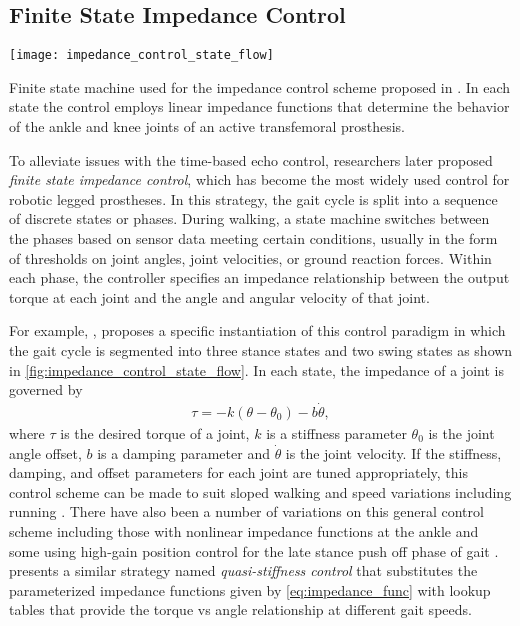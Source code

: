\subsection{Finite State Impedance Control}\label{sec:back_walk_fsm}
\begin{marginfigure}
    \centering
    \texttt{[image: impedance\_control\_state\_flow]}
    \caption[Example finite state machine for the impedance control].{Finite
    state machine used for the impedance control scheme proposed in
    \citet{sup2009preliminary}. In each state the control employs linear
    impedance functions that determine the behavior of the ankle and knee joints
    of an active transfemoral
    prosthesis.}\label{fig:impedance_control_state_flow}
\end{marginfigure}
To alleviate issues with the time-based echo control, researchers later proposed
\emph{finite state impedance control}, which has become the most widely used
control for robotic legged prostheses. In this strategy, the gait cycle is split
into a sequence of discrete states or phases. During walking, a state machine
switches between the phases based on sensor data meeting certain conditions,
usually in the form of thresholds on joint angles, joint velocities, or ground
reaction forces. Within each phase, the controller specifies an impedance
relationship between the output torque at each joint and the angle and angular
velocity of that joint.

For example, \citet{sup2009preliminary}, proposes a specific instantiation of
this control paradigm in which the gait cycle is segmented into three stance
states and two swing states as shown in \cref{fig:impedance_control_state_flow}.
In each state, the impedance of a joint is governed by
\begin{align}
    \tau = -k (\theta - \theta_{0}) - b \dot \theta,\label{eq:impedance_func}
\end{align}
where $\tau$ is the desired torque of a joint, $k$ is a stiffness parameter
$\theta_{0}$ is the joint angle offset, $b$ is a damping parameter and $\dot
\theta$ is the joint velocity. If the stiffness, damping, and offset parameters
for each joint are tuned appropriately, this control scheme can be made to suit
sloped walking \citep{sup2011upslope} and speed variations
\citep{shultz2016variable} including running \citep{shultz2015running}. There
have also been a number of variations on this general control scheme including
those with nonlinear impedance functions at the ankle
\citep{sup2007design,shultz2014walking} and some using high-gain position
control for the late stance push off phase of gait \citep{lawson2014robotic}.
\citet{lenzi2014speed} presents a similar strategy named \emph{quasi-stiffness
control} that substitutes the parameterized impedance functions given by
\cref{eq:impedance_func} with lookup tables that provide the torque vs angle
relationship at different gait speeds. 

